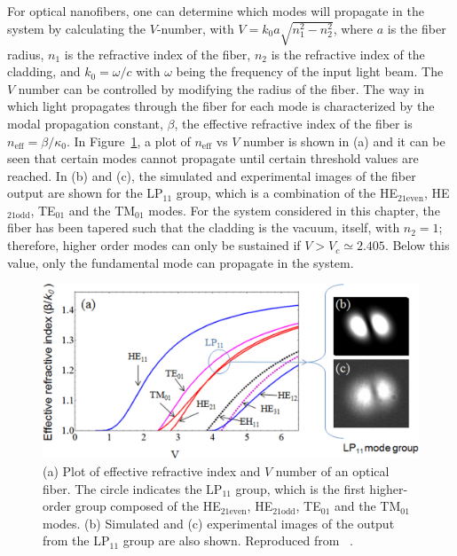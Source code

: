 For optical nanofibers, one can determine which modes will propagate in the system by calculating the $V$-number, with $V = k_0a\sqrt{n_1^2 - n_2^2}$, where $a$ is the fiber radius, $n_1$ is the refractive index of the fiber, $n_2$ is the refractive index of the cladding, and $k_0 = \omega/c$ with $\omega$ being the frequency of the input light beam.
The $V$ number can be controlled by modifying the radius of the fiber.
The way in which light propagates through the fiber for each mode is characterized by the modal propagation constant, $\beta$,
the effective refractive index of the fiber is $n_\text{eff} = \beta / \kappa_0$.
In Figure~\ref{fig:mode_plot}, a plot of $n_\text{eff}$ vs $V$ number is shown in (a) and it can be seen that certain modes cannot propagate until certain threshold values are reached.
In (b) and (c), the simulated and experimental images of the fiber output are shown for the LP$_{11}$ group, which is a combination of the HE$_{21\text{even}}$, HE$_{21\text{odd}}$, TE$_{01}$ and the TM$_{01}$ modes.
For the system considered in this chapter, the fiber has been tapered such that the cladding is the vacuum, itself, with $n_2=1$; therefore, higher order modes can only be sustained if $V > V_c \simeq 2.405$.
Below this value, only the fundamental mode can propagate in the system.

\begin{figure}

\center \includegraphics[width=\textwidth]{data/3d/fiber/mode_plot.jpg}
\caption{(a) Plot of effective refractive index and $V$ number of an optical fiber.
The circle indicates the LP$_{11}$ group, which is the first higher-order group composed of the HE$_{21\text{even}}$, HE$_{21\text{odd}}$, TE$_{01}$ and the TM$_{01}$ modes.
(b) Simulated and (c) experimental images of the output from the LP$_{11}$ group are also shown.
Reproduced from ~\cite{nieddu2016, kumar2015}.
}
\label{fig:mode_plot}
\end{figure}

